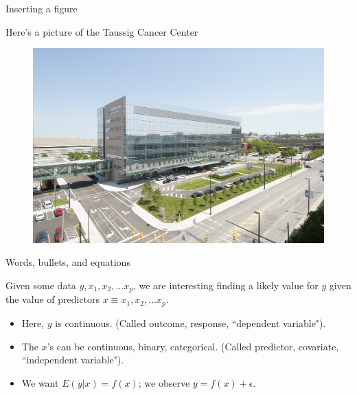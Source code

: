\documentclass{beamer}
\begin{document}
\begin{frame}{Inserting a figure}

Here's a picture of the Taussig Cancer Center

\begin{figure}[t]
    \includegraphics[width=.8\textwidth]{./figs/taussig-cancer-center_05-16-17}  
\end{figure}

\end{frame} 

\begin{frame}{Words, bullets, and equations}

Given some data $y, x_1, x_2, \ldots x_p$, we are interesting finding a likely value for $y$ given the value of predictors $x  \equiv x_1, x_2, \ldots x_p$.
\begin{itemize}
	\item Here, $y$ is continuous. (Called outcome, response, ``dependent variable").
	\item The $x$'s can be continuous, binary, categorical. (Called predictor, covariate, ``independent variable").
	\item We want $E(y | x) = f(x)$; we observe $y = f(x) + \epsilon$.
\end{itemize}

\end{frame}


\end{document}
